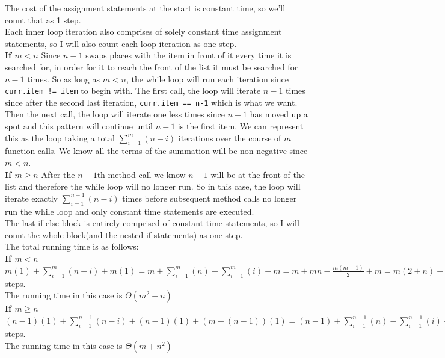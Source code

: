 \documentclass[fontsize=11pt]{article}
\begin{document}
\begin{enumerate}
\begin{enumerate}
    The cost of the assignment statements at the start is constant time, so we'll count that as 1 step.\\

    Each inner loop iteration also comprises of solely constant time assignment statements, so I will also count each loop iteration as one step.\\
    \textbf{If $m < n$}
    Since $n-1$ swaps places with the item in front of it every time it is searched for, in order for it to reach the front of the list it must be searched for $n-1$ times. So as long as $m < n$, the while loop will run each iteration since \texttt{curr.item != item} to begin with. The first call, the loop will iterate $n-1$ times since after the second last iteration, \texttt{curr.item == n-1} which is what we want. Then the next call, the loop will iterate one less times since $n-1$ has moved up a spot and this pattern will continue until $n-1$ is the first item. We can represent this as the loop taking a total $\sum_{i=1}^{m} (n-i)$ iterations over the course of $m$ function calls. We know all the terms of the summation will be non-negative since $m < n$.\\
    \textbf{If $m \geq n$}
    After the $n-1$th method call we know $n-1$ will be at the front of the list and therefore the while loop will no longer run. So in this case, the loop will iterate exactly $\sum_{i=1}^{n-1} (n-i)$ times before subsequent method calls no longer run the while loop and only constant time statements are executed.\\

    The last if-else block is entirely comprised of constant time statements, so I will count the whole block(and the nested if statements) as one step.\\
    The total running time is as follows:\\
    \textbf{If $m < n$}\\
    $m(1) + \sum_{i=1}^{m} (n-i) + m(1) = m + \sum_{i=1}^{m} (n) - \sum_{i=1}^{m} (i) + m = m + mn - \frac{m(m+1)}{2} + m = m(2+n) - \frac{m(m+1)}{2}$ steps.\\
    The running time in this case is $\Theta(m^2 + n)$\\

    \textbf{If $m \geq n$}\\
    $(n-1)(1) + \sum_{i=1}^{n-1} (n-i) + (n-1)(1) + (m-(n-1))(1) = (n-1) + \sum_{i=1}^{n-1} (n) -\sum_{i=1}^{n-1} (i) + (n-1) + (m-(n-1)) = 2(n-1) + n(n-1) - \frac{(n-1)n}{2} + m - n + 1 = m - n + (2+n)(n-1) - \frac{(n-1)n}{2} + 1$ steps.\\
    The running time in this case is $\Theta(m + n^2)$\\


\end{enumerate}
\end{enumerate}
\end{document}
